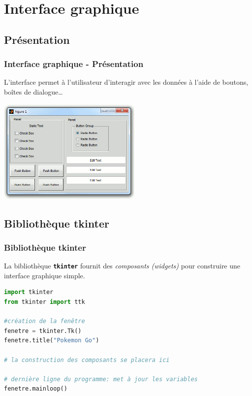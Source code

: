 \documentclass[svgnames,11pt]{beamer}
\begin{document}
\section{Interface graphique}
\subsection{Présentation}
\begin{frame}
    \frametitle{Interface graphique - Présentation}

    L'interface permet à l'utilisateur d'interagir avec les données à l'aide de boutons, boîtes de dialogue\dots
    \begin{center}
        \centering
        \includegraphics[width=7cm]{ressources/interface.png}
        \label{IMG}
    \end{center}

\end{frame}
\subsection{Bibliothèque tkinter}
\begin{frame}[fragile]
    \frametitle{Bibliothèque tkinter}

    La bibliothèque \texttt{\textbf{tkinter}} fournit des \emph{composants (widgets)} pour construire une interface graphique simple.
    \begin{center}
        \begin{lstlisting}[language=Python,basicstyle=\ttfamily\small,xrightmargin=1em,xleftmargin=1em]
import tkinter
from tkinter import ttk

#création de la fenêtre
fenetre = tkinter.Tk()
fenetre.title("Pokemon Go")

# la construction des composants se placera ici

# dernière ligne du programme: met à jour les variables 
fenetre.mainloop()
\end{lstlisting}
        \label{interface}
    \end{center}

\end{frame}
\end{document}
